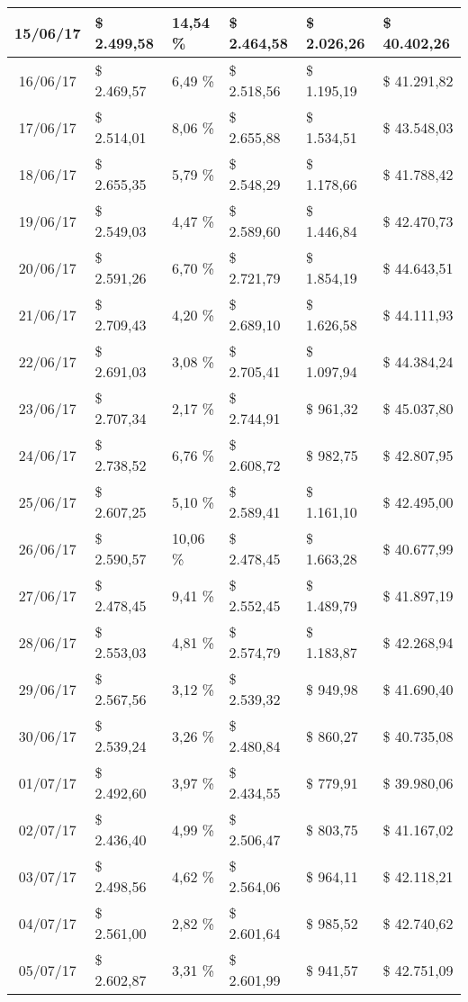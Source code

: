 \begin{small}
\begin{longtable}{|c|l|l|l|l|l|}
15/06/17 & \$ 2.499,58 & 14,54 \% & \$ 2.464,58 & \$ 2.026,26 & \$ 40.402,26 \\ \hline
16/06/17 & \$ 2.469,57 & 6,49 \% & \$ 2.518,56 & \$ 1.195,19 & \$ 41.291,82 \\ \hline
17/06/17 & \$ 2.514,01 & 8,06 \% & \$ 2.655,88 & \$ 1.534,51 & \$ 43.548,03 \\ \hline
18/06/17 & \$ 2.655,35 & 5,79 \% & \$ 2.548,29 & \$ 1.178,66 & \$ 41.788,42 \\ \hline
19/06/17 & \$ 2.549,03 & 4,47 \% & \$ 2.589,60 & \$ 1.446,84 & \$ 42.470,73 \\ \hline
20/06/17 & \$ 2.591,26 & 6,70 \% & \$ 2.721,79 & \$ 1.854,19 & \$ 44.643,51 \\ \hline
21/06/17 & \$ 2.709,43 & 4,20 \% & \$ 2.689,10 & \$ 1.626,58 & \$ 44.111,93 \\ \hline
22/06/17 & \$ 2.691,03 & 3,08 \% & \$ 2.705,41 & \$ 1.097,94 & \$ 44.384,24 \\ \hline
23/06/17 & \$ 2.707,34 & 2,17 \% & \$ 2.744,91 & \$ 961,32 & \$ 45.037,80 \\ \hline
24/06/17 & \$ 2.738,52 & 6,76 \% & \$ 2.608,72 & \$ 982,75 & \$ 42.807,95 \\ \hline
25/06/17 & \$ 2.607,25 & 5,10 \% & \$ 2.589,41 & \$ 1.161,10 & \$ 42.495,00 \\ \hline
26/06/17 & \$ 2.590,57 & 10,06 \% & \$ 2.478,45 & \$ 1.663,28 & \$ 40.677,99 \\ \hline
27/06/17 & \$ 2.478,45 & 9,41 \% & \$ 2.552,45 & \$ 1.489,79 & \$ 41.897,19 \\ \hline
28/06/17 & \$ 2.553,03 & 4,81 \% & \$ 2.574,79 & \$ 1.183,87 & \$ 42.268,94 \\ \hline
29/06/17 & \$ 2.567,56 & 3,12 \% & \$ 2.539,32 & \$ 949,98 & \$ 41.690,40 \\ \hline
30/06/17 & \$ 2.539,24 & 3,26 \% & \$ 2.480,84 & \$ 860,27 & \$ 40.735,08 \\ \hline
01/07/17 & \$ 2.492,60 & 3,97 \% & \$ 2.434,55 & \$ 779,91 & \$ 39.980,06 \\ \hline
02/07/17 & \$ 2.436,40 & 4,99 \% & \$ 2.506,47 & \$ 803,75 & \$ 41.167,02 \\ \hline
03/07/17 & \$ 2.498,56 & 4,62 \% & \$ 2.564,06 & \$ 964,11 & \$ 42.118,21 \\ \hline
04/07/17 & \$ 2.561,00 & 2,82 \% & \$ 2.601,64 & \$ 985,52 & \$ 42.740,62 \\ \hline
05/07/17 & \$ 2.602,87 & 3,31 \% & \$ 2.601,99 & \$ 941,57 & \$ 42.751,09 \\ \hline

\end{longtable}
\end{small}
